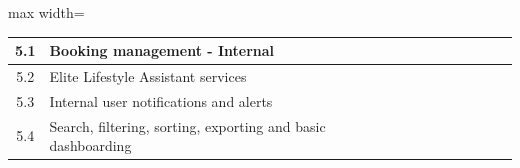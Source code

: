 \begin{table}[htbp]
\begin{adjustbox}{max width=\textwidth}
\begin{tabular}{|c|>{\raggedright\arraybackslash}p{3.2cm}|c|c|c|c|c|c|c|c|}
\hline
5.1 & Booking management - Internal & & & & & & \cellcolor{ganttfill} & \cellcolor{ganttfill} & \\
\hline
5.2 & Elite Lifestyle Assistant services & & & & & & & \cellcolor{ganttfill} & \cellcolor{ganttfill} \\
\hline
5.3 & Internal user notifications and alerts & & & & & & & \cellcolor{ganttfill} & \cellcolor{ganttfill} \\
\hline
5.4 & Search, filtering, sorting, exporting and basic dashboarding & & & & & & & & \cellcolor{ganttfill} \\
\hline
\end{tabular}
\end{adjustbox}
\end{table}
